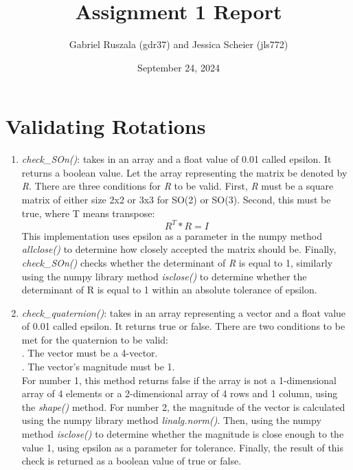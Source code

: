 \documentclass{article}
\title{Assignment 1 Report}
\author{Gabriel Ruszala (gdr37) and Jessica Scheier (jls772)}
\date{September 24, 2024}
\begin{document}
\maketitle

\section{Validating Rotations}
\begin{enumerate}
\item \textit{check\_SOn()}: takes in an array and a float value of 0.01 called epsilon. It returns a boolean value. Let the array representing the matrix be denoted by \textit{R}. There are three conditions for \textit{R} to be valid. First, \textit{R} must be a square matrix of either size 2x2 or 3x3 for SO(2) or SO(3). Second, this must be true, where T means transpose: 
\[R^T * R = I\]
This implementation uses epsilon as a parameter in the numpy method \textit{allclose()} to determine how closely accepted the matrix should be.
Finally, \textit{check\_SOn()} checks whether the determinant of \textit{R} is equal to 1, similarly using the numpy library method \textit{isclose()} to determine whether the determinant of R is equal to 1 within an absolute tolerance of epsilon.

\item \textit{check\_quaternion()}: takes in an array representing a vector and a float value of 0.01 called epsilon. It returns true or false. There are two conditions to be met for the quaternion to be valid:\\
. The vector must be a 4-vector.\\
. The vector's magnitude must be 1.\\
For number 1, this method returns false if the array is not a 1-dimensional array of 4 elements or a 2-dimensional array of 4 rows and 1 column, using the \textit{shape()} method. For number 2, the magnitude of the vector is calculated using the numpy library method \textit{linalg.norm()}. Then, using the numpy method \textit{isclose()} to determine whether the magnitude is close enough to the value 1, using epsilon as a parameter for tolerance. Finally, the result of this check is returned as a boolean value of true or false.


\end{enumerate}
\end{document}
